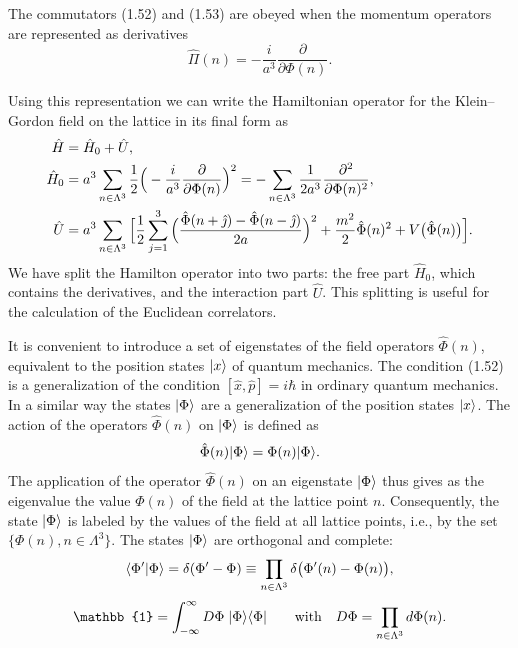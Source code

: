 The commutators (1.52) and (1.53) are obeyed when the momentum operators are
represented as derivatives
\begin{equation}
  \hat{\Pi}(n) = -\frac{i}{a^3}\frac{\partial}{\partial\Phi(n)}.
\end{equation}

Using this representation we can write the Hamiltonian operator for the
Klein--Gordon field on the lattice in its final form as
\begin{align}
  \hat{H} &= \hat{H}_0 + \hat{U}, \notag\\
  \hat{H}_0 &= a^3\sum_{n\in\Lambda^3}\frac{1}{2}
    \Big(-\frac{i}{a^3}\frac{\partial}{\partial\Phi(n)}\Big)^2
    = -\sum_{n\in\Lambda^3}\frac{1}{2a^3}\frac{\partial^2}{\partial\Phi(n)^2}, \notag\\
  \hat{U} &= a^3\sum_{n\in\Lambda^3}\Big[
    \frac{1}{2}\sum_{j=1}^3
      \Big(\frac{\hat{\Phi}(n+\hat{\jmath}) - \hat{\Phi}(n-\hat{\jmath})}{2a}\Big)^2
    + \frac{m^2}{2}\hat{\Phi}(n)^2 + V\big(\hat{\Phi}(n)\big)\Big].
\end{align}
We have split the Hamilton operator into two parts: the free part $\hat{H}_0$,
which contains the derivatives, and the interaction part $\hat{U}$. This
splitting is useful for the calculation of the Euclidean correlators.

It is convenient to introduce a set of eigenstates of the field operators
$\hat{\Phi}(n)$, equivalent to the position states $|x\rangle$ of quantum
mechanics. The condition (1.52) is a generalization of the condition
$[\hat{x}, \hat{p}] = i\hbar$ in ordinary quantum mechanics. In a similar way
the states $|\Phi\rangle$ are a generalization of the position states $|x\rangle$.
The action of the operators $\hat{\Phi}(n)$ on $|\Phi\rangle$ is defined as
\begin{equation}
  \hat{\Phi}(n)|\Phi\rangle = \Phi(n)|\Phi\rangle.
\end{equation}
The application of the operator $\hat{\Phi}(n)$ on an eigenstate $|\Phi\rangle$
thus gives as the eigenvalue the value $\Phi(n)$ of the field at the lattice
point $n$. Consequently, the state $|\Phi\rangle$ is labeled by the values of the
field at all lattice points, i.e., by the set $\{\Phi(n), n \in \Lambda^3\}$.
The states $|\Phi\rangle$ are orthogonal and complete:
\begin{equation}
  \langle\Phi'|\Phi\rangle = \delta(\Phi' - \Phi)
  \equiv \prod_{n\in\Lambda^3}\delta\big(\Phi'(n) - \Phi(n)\big),
\end{equation}
\begin{equation}
  \mathbb{1} = \int_{-\infty}^{\infty}D\Phi\;\ket{\Phi}\bra{\Phi}
  \qquad \text{with} \quad D\Phi = \prod_{n\in\Lambda^3}d\Phi(n).
\end{equation}


